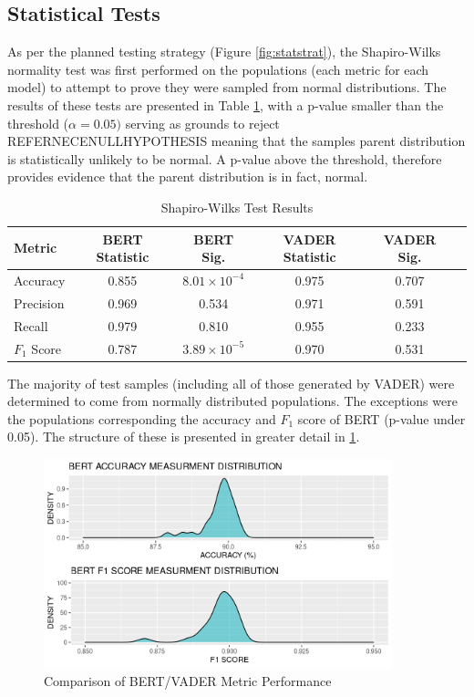 \documentclass{csfourzero}
\begin{document}
\subsection{Statistical Tests}

As per the planned testing strategy (Figure \ref{fig:statstrat}), the Shapiro-Wilks normality test was first performed on the populations (each metric for each model) to attempt to prove they were sampled from normal distributions. The results of these tests are presented in Table \ref{tab:swresults}, with a p-value smaller than the threshold ($\alpha = 0.05)$ serving as grounds to reject REFERNECENULLHYPOTHESIS meaning that the samples parent distribution is statistically unlikely to be normal. A p-value above the threshold, therefore provides evidence that the parent distribution is in fact, normal.

\begin{table}[H]
    \centering
    \caption{Shapiro-Wilks Test Results}
    \begin{tabular}[t]{lccccc}
        \hline
            Metric & BERT Statistic &  BERT Sig. & VADER Statistic & VADER Sig.\\
        \hline
            Accuracy & 0.855 & $8.01 \times 10^{-4}$ & 0.975 & 0.707 \\
            Precision & 0.969 & 0.534 & 0.971 & 0.591 \\
            Recall & 0.979 & 0.810 & 0.955 & 0.233\\
            $F_1$ Score &0.787 & $3.89 \times 10^{-5}$  & 0.970 & 0.531\\
        \hline
    \end{tabular}
    \label{tab:swresults}
\end{table}

\par

The majority of test samples (including all of those generated by VADER) were determined to come from normally distributed populations. The exceptions were the populations corresponding the accuracy and $F_1$ score of BERT (p-value under 0.05). The structure of these is presented in greater detail in \ref{fig:wierddist}. 

\begin{figure}[H]
    \centering
    \includegraphics[width=0.9\textwidth]{img/odd_distributions.png}
    \caption{Comparison of BERT/VADER Metric Performance}
    \label{fig:wierddist}
\end{figure}
\end{document}
